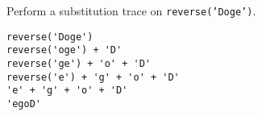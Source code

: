 Perform a substitution trace on \texttt{reverse('Doge')}.

\begin{answer}
\begin{lstlisting}[numbers=none]
reverse('Doge')
reverse('oge') + 'D'
reverse('ge') + 'o' + 'D'
reverse('e') + 'g' + 'o' + 'D'
'e' + 'g' + 'o' + 'D'
'egoD'
\end{lstlisting}
\end{answer}